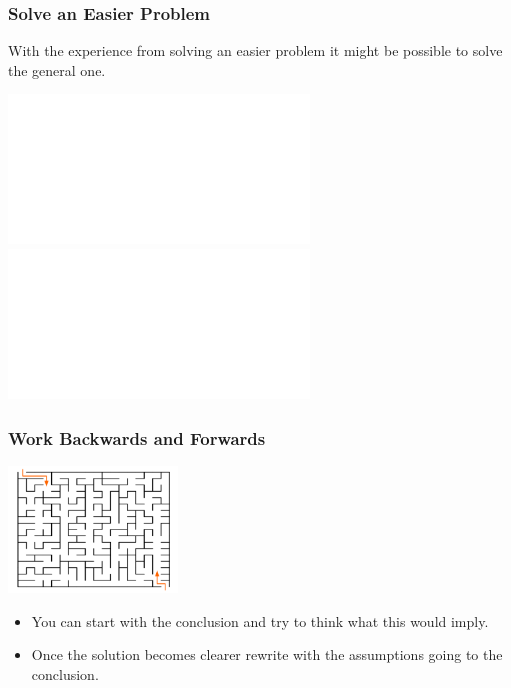 \documentclass{beamer}
\begin{document}
\fi

\begin{frame}%
\frametitle{Solve an Easier Problem}

With the experience from solving an easier problem it might be possible to solve the general one.\\


\begin{overlayarea}{1\textwidth}{0.7\textheight}
\begin{center}
\includegraphics<2>[width=8cm]{polya_easier.pdf}%
\includegraphics<3>[width=8cm]{polya_easier1.pdf}%
\end{center}
\end{overlayarea}


\end{frame}


\begin{frame}%
\frametitle{Work Backwards and Forwards}

\begin{center}
\includegraphics[width=4.5cm]{maze.pdf}%
\end{center}

\begin{itemize}

\item You can start with the conclusion and try to think what this would imply.

\vspace{0.15cm}

\item<2-> Once the solution becomes clearer rewrite with the assumptions going to the conclusion.

\end{itemize}





\end{frame}
\end{document}

